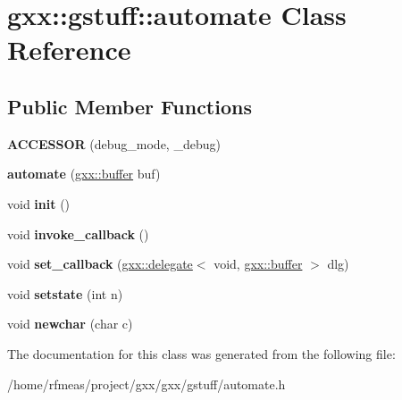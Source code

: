 \hypertarget{classgxx_1_1gstuff_1_1automate}{}\section{gxx\+:\+:gstuff\+:\+:automate Class Reference}
\label{classgxx_1_1gstuff_1_1automate}
\subsection*{Public Member Functions}
\begin{DoxyCompactItemize}
\item 
{\bfseries A\+C\+C\+E\+S\+S\+OR} (debug\+\_\+mode, \+\_\+debug)\hypertarget{classgxx_1_1gstuff_1_1automate_a36821652fd6f020cdf300cd2839a23da}{}\label{classgxx_1_1gstuff_1_1automate_a36821652fd6f020cdf300cd2839a23da}

\item 
{\bfseries automate} (\hyperlink{classgxx_1_1buffer}{gxx\+::buffer} buf)\hypertarget{classgxx_1_1gstuff_1_1automate_a615464ac28650b81d9cc08dcdaef1115}{}\label{classgxx_1_1gstuff_1_1automate_a615464ac28650b81d9cc08dcdaef1115}

\item 
void {\bfseries init} ()\hypertarget{classgxx_1_1gstuff_1_1automate_a254012d093a9f5d3c7ceb8a5e34bc68f}{}\label{classgxx_1_1gstuff_1_1automate_a254012d093a9f5d3c7ceb8a5e34bc68f}

\item 
void {\bfseries invoke\+\_\+callback} ()\hypertarget{classgxx_1_1gstuff_1_1automate_aa538f15878a88a4b99bc697a4013b029}{}\label{classgxx_1_1gstuff_1_1automate_aa538f15878a88a4b99bc697a4013b029}

\item 
void {\bfseries set\+\_\+callback} (\hyperlink{classgxx_1_1delegate}{gxx\+::delegate}$<$ void, \hyperlink{classgxx_1_1buffer}{gxx\+::buffer} $>$ dlg)\hypertarget{classgxx_1_1gstuff_1_1automate_a6bd819c94315fb909e707fd15d721201}{}\label{classgxx_1_1gstuff_1_1automate_a6bd819c94315fb909e707fd15d721201}

\item 
void {\bfseries setstate} (int n)\hypertarget{classgxx_1_1gstuff_1_1automate_a1c4d32b4b8011495d6c4545f79846c55}{}\label{classgxx_1_1gstuff_1_1automate_a1c4d32b4b8011495d6c4545f79846c55}

\item 
void {\bfseries newchar} (char c)\hypertarget{classgxx_1_1gstuff_1_1automate_af3859c6b82bca73030ad74d3d4ed360d}{}\label{classgxx_1_1gstuff_1_1automate_af3859c6b82bca73030ad74d3d4ed360d}

\end{DoxyCompactItemize}


The documentation for this class was generated from the following file\+:\begin{DoxyCompactItemize}
\item 
/home/rfmeas/project/gxx/gxx/gstuff/automate.\+h\end{DoxyCompactItemize}
